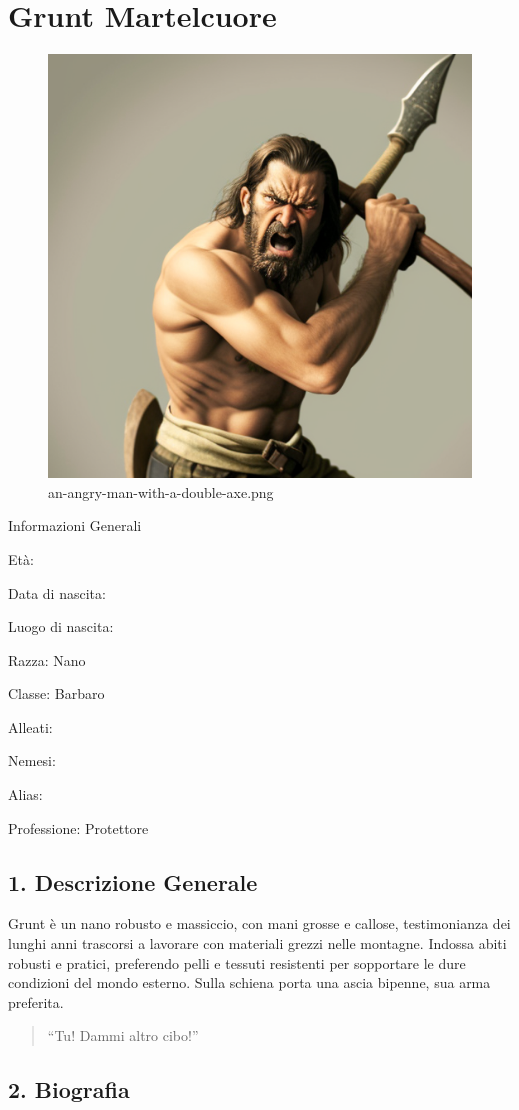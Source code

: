\section{Grunt Martelcuore}\label{grunt-martelcuore}


\begin{figure}
\centering
\includegraphics{an-angry-man-with-a-double-axe.png}
\caption{an-angry-man-with-a-double-axe.png}
\end{figure}

Informazioni Generali

Età:

Data di nascita:

Luogo di nascita:

Razza: Nano

Classe: Barbaro

Alleati:

Nemesi:

Alias:

Professione: Protettore


\subsection{1. Descrizione Generale}\label{descrizione-generale}


Grunt è un nano robusto e massiccio, con mani grosse e callose,
testimonianza dei lunghi anni trascorsi a lavorare con materiali grezzi
nelle montagne. Indossa abiti robusti e pratici, preferendo pelli e
tessuti resistenti per sopportare le dure condizioni del mondo esterno.
Sulla schiena porta una ascia bipenne, sua arma preferita.

\begin{quote}
``Tu! Dammi altro cibo!''
\end{quote}

\subsection{2. Biografia}\label{biografia}


